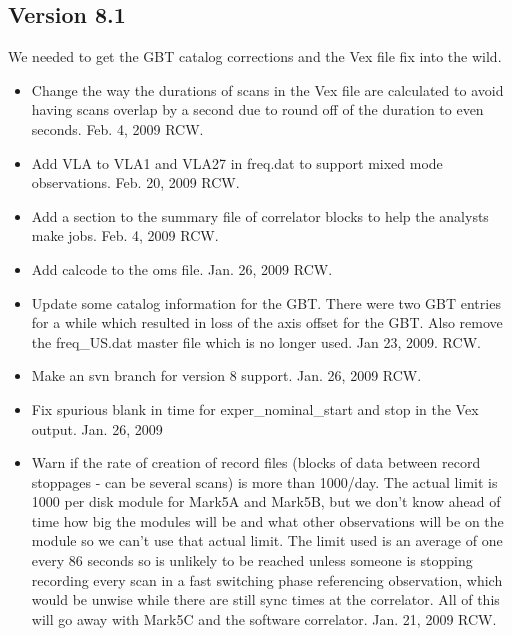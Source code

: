\documentclass{report}
\begin{document}
\subsection{\label{SSEC:VER_8.1}Version 8.1}

We needed to get the GBT catalog corrections and the Vex file fix
into the wild.


\begin{itemize}

\item Change the way the durations of scans in the Vex file are
calculated to avoid having scans overlap by a second due to
round off of the duration to even seconds.  Feb. 4, 2009  RCW.

\item  Add VLA to VLA1 and VLA27 in freq.dat to support mixed mode
observations.  Feb. 20, 2009 RCW.

\item Add a section to the summary file of correlator blocks to
help the analysts make jobs.  Feb. 4, 2009  RCW.

\item Add calcode to the oms file.  Jan. 26, 2009  RCW.

\item Update some catalog information for the GBT.  There were two GBT
entries for a while which resulted in loss of the axis offset for the
GBT. Also remove the freq\_US.dat master file which is no longer used.
Jan 23, 2009. RCW.

\item Make an svn branch for version 8 support.  Jan. 26, 2009  RCW.

\item Fix spurious blank in time for exper\_nominal\_start and stop in
the Vex output.  Jan. 26, 2009

\item Warn if the rate of creation of record files (blocks of data
between record stoppages - can be several scans) is more than
1000/day.  The actual limit is 1000 per disk module for Mark5A and
Mark5B, but we don't know ahead of time how big the modules will be
and what other observations will be on the module so we can't use that
actual limit.  The limit used is an average of one every 86 seconds so
is unlikely to be reached unless someone is stopping recording every
scan in a fast switching phase referencing observation, which would be
unwise while there are still sync times at the correlator.  All of
this will go away with Mark5C and the software correlator.  Jan. 21,
2009 RCW.


\end{itemize}
\end{document}
